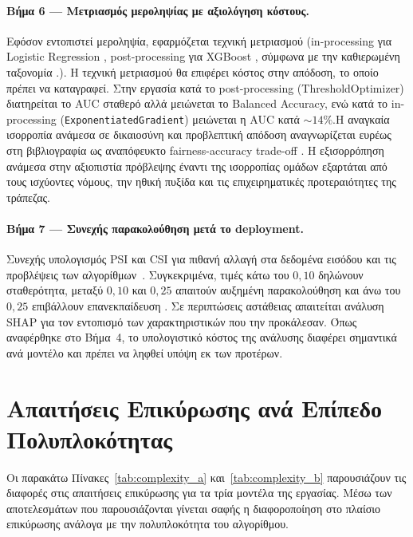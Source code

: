 \paragraph{Βήμα 6 --- Μετριασμός μεροληψίας με αξιολόγηση κόστους.}
Εφόσον εντοπιστεί μεροληψία, εφαρμόζεται τεχνική μετριασμού
(in-processing για Logistic Regression \citep{agarwal2018reductions}, 
post-processing για XGBoost \citep{hardt2016equality}, σύμφωνα με την 
καθιερωμένη ταξονομία \citep{kamiran2012data}.). Η τεχνική μετριασμού θα επιφέρει κόστος στην
απόδοση, το οποίο πρέπει να καταγραφεί. Στην εργασία κατά
το post-processing (ThresholdOptimizer) διατηρείται το AUC
σταθερό αλλά μειώνεται το Balanced Accuracy, ενώ κατά το
in-processing (\texttt{ExponentiatedGradient}) μειώνεται η
AUC κατά ${\sim}14\%$.Η αναγκαία ισορροπία ανάμεσα σε δικαιοσύνη 
και προβλεπτική απόδοση αναγνωρίζεται ευρέως στη βιβλιογραφία ως 
αναπόφευκτο fairness-accuracy trade-off \citep{kozodoi2022fairness}.
Η εξισορρόπηση ανάμεσα στην
αξιοπιστία πρόβλεψης έναντι της ισορροπίας ομάδων
εξαρτάται από τους ισχύοντες νόμους, την ηθική πυξίδα και
τις επιχειρηματικές προτεραιότητες της τράπεζας.

\paragraph{Βήμα 7 --- Συνεχής παρακολούθηση μετά το deployment.}
Συνεχής υπολογισμός PSI και CSI για πιθανή αλλαγή στα
δεδομένα εισόδου και τις προβλέψεις των
αλγορίθμων~\citep{eba2023}. Συγκεκριμένα, τιμές κάτω του
$0{,}10$ δηλώνουν σταθερότητα, μεταξύ $0{,}10$ και $0{,}25$
απαιτούν αυξημένη παρακολούθηση και άνω του $0{,}25$
επιβάλλουν επανεκπαίδευση \citep{yurdakul2018statistical, siddiqi2017intelligent}. Σε περιπτώσεις αστάθειας
απαιτείται ανάλυση SHAP για τον εντοπισμό των
χαρακτηριστικών που την προκάλεσαν. Όπως αναφέρθηκε στο
Βήμα~4, το υπολογιστικό κόστος της ανάλυσης διαφέρει
σημαντικά ανά μοντέλο και πρέπει να ληφθεί υπόψη εκ των
προτέρων.

\section{Απαιτήσεις Επικύρωσης ανά Επίπεδο Πολυπλοκότητας}
\label{sec:complexity_requirements}

Οι παρακάτω Πίνακες~\ref{tab:complexity_a} και~\ref{tab:complexity_b}
παρουσιάζουν τις διαφορές στις απαιτήσεις επικύρωσης για τα τρία
μοντέλα της εργασίας. Μέσω των αποτελεσμάτων που παρουσιάζονται
γίνεται σαφής η διαφοροποίηση στο πλαίσιο επικύρωσης ανάλογα με
την πολυπλοκότητα του αλγορίθμου.

